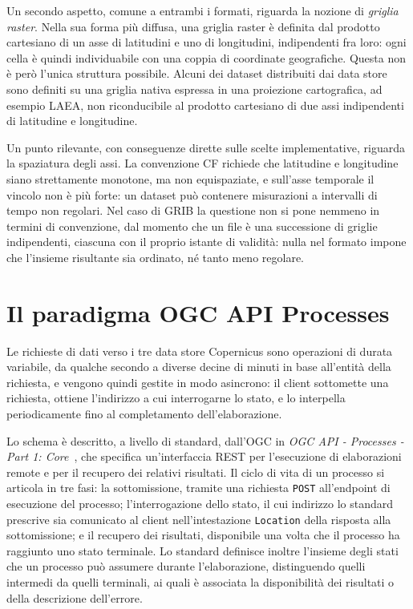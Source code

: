 Un secondo aspetto, comune a entrambi i formati, riguarda la nozione di
\emph{griglia raster}. Nella sua forma più diffusa, una griglia raster è
definita dal prodotto cartesiano di un asse di latitudini e uno di longitudini,
indipendenti fra loro: ogni cella è quindi individuabile con una coppia di
coordinate geografiche. Questa non è però l'unica struttura possibile.
Alcuni dei dataset distribuiti dai data store sono definiti su una griglia nativa espressa in
una proiezione cartografica, ad esempio \ac{LAEA}, non riconducibile al prodotto
cartesiano di due assi indipendenti di latitudine e longitudine.

Un punto rilevante, con conseguenze dirette sulle scelte implementative,
riguarda la spaziatura degli assi. La convenzione \ac{CF} richiede che
latitudine e longitudine siano strettamente monotone, ma non equispaziate, e
sull'asse temporale il vincolo non è più forte: un dataset può
contenere misurazioni a intervalli di tempo non regolari.
Nel caso di \ac{GRIB} la questione non si pone nemmeno in
termini di convenzione, dal momento che un file è una successione di
griglie indipendenti, ciascuna con il proprio istante di validità: nulla
nel formato impone che l'insieme risultante sia ordinato, né tanto meno
regolare.

\section{Il paradigma OGC API Processes}
\label{sec:ogc-api-processes}

Le richieste di dati verso i tre data store Copernicus sono operazioni di durata variabile,
da qualche secondo a diverse decine di minuti in base all'entità della richiesta, e vengono
quindi gestite in modo asincrono: il client sottomette una richiesta, ottiene l'indirizzo a
cui interrogarne lo stato, e lo interpella periodicamente fino al completamento
dell'elaborazione.

Lo schema è descritto, a livello di standard, dall'\ac{OGC} in \emph{OGC API - Processes -
Part 1: Core}~\cite{ogc_api_processes_core}, che specifica un'interfaccia REST per
l'esecuzione di elaborazioni remote e per il recupero dei relativi risultati. Il ciclo di
vita di un processo si articola in tre fasi:
la sottomissione, tramite una richiesta \texttt{POST} all'endpoint di esecuzione del
processo; l'interrogazione dello stato, il cui indirizzo lo standard prescrive sia
comunicato al client nell'intestazione \texttt{Location} della risposta alla
sottomissione; e il recupero dei risultati, disponibile una volta che il processo ha raggiunto
uno stato terminale. Lo standard definisce inoltre l'insieme degli stati che un processo può
assumere durante l'elaborazione, distinguendo quelli intermedi da quelli terminali, ai
quali è associata la disponibilità dei risultati o della descrizione dell'errore.

